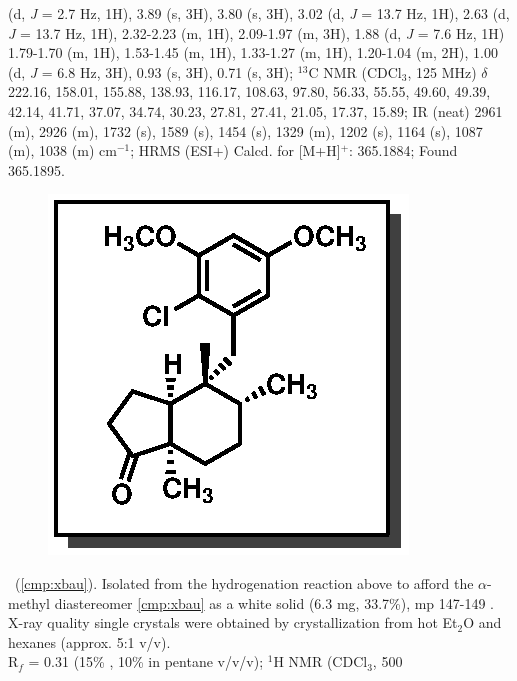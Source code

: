 (d, \textit{J} = 2.7 Hz, 1H), 3.89 (s, 3H), 3.80 (s, 3H), 3.02 (d, \textit{J} = 13.7 Hz, 1H), 2.63 (d, \textit{J} = 13.7 Hz,
1H), 2.32-2.23 (m, 1H), 2.09-1.97 (m, 3H), 1.88 (d, \textit{J} = 7.6 Hz, 1H) 1.79-1.70 (m, 1H), 1.53-1.45
(m, 1H), 1.33-1.27 (m, 1H), 1.20-1.04 (m, 2H), 1.00 (d, \textit{J} = 6.8 Hz, 3H), 0.93 (s, 3H), 0.71 (s,
3H); $^{13}$C NMR (CDCl$_3$, 125 MHz) $\delta$ 222.16, 158.01, 155.88, 138.93, 116.17, 108.63, 97.80,
56.33, 55.55, 49.60, 49.39, 42.14, 41.71, 37.07, 34.74, 30.23, 27.81, 27.41, 21.05, 17.37, 15.89;
IR (neat) 2961 (m), 2926 (m), 1732 (s), 1589 (s), 1454 (s), 1329 (m), 1202 (s), 1164 (s), 1087
(m), 1038 (m) cm$^{-1}$; HRMS (ESI+) Calcd. for  [M+H]$^+$: 365.1884; Found 365.1895.

\vspace{10pt}
\begin{figure}
  \vspace{-25pt}
  \begin{center}
    \includegraphics[scale=0.8]{chp_singlecarbon/images/xbau}
  \end{center}
  \vspace{-30pt}
\end{figure}\noindent \textbf{\CMPxbau}\ (\ref{cmp:xbau}). Isolated from the hydrogenation
reaction above to afford the $\alpha$-methyl diastereomer  \ref{cmp:xbau} as a white solid (6.3 mg,
33.7\%), mp 147-149 \degc. X-ray quality single crystals  were obtained by
crystallization from hot Et$_2$O and hexanes (approx. 5:1 v/v). \\
R$_f$ = 0.31 (15\% , 10\%  in pentane v/v/v); $^1$H NMR (CDCl$_3$, 500

